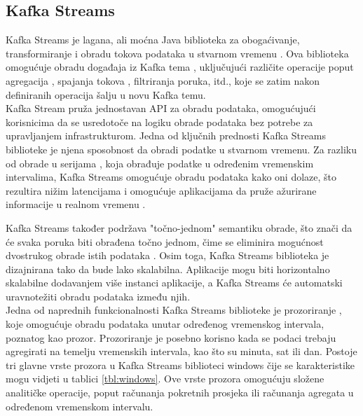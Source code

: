\documentclass[times, utf8, diplomski]{fer}
\begin{document}
\clearpage
\subsection{Kafka Streams}
\label{sec:kstream}

Kafka Streams je lagana, ali moćna Java biblioteka za obogaćivanje, transformiranje i obradu tokova podataka u stvarnom vremenu \citep{seymour_mastering_2021}. Ova biblioteka omogućuje obradu događaja  iz Kafka tema , uključujući različite operacije poput agregacija , spajanja tokova , filtriranja poruka, itd., koje se zatim nakon definiranih operacija šalju u novu Kafka temu. \\

Kafka Stream pruža jednostavan API za obradu podataka, omogućujući korisnicima da se usredotoče na logiku obrade podataka bez potrebe za upravljanjem infrastrukturom. Jedna od ključnih prednosti Kafka Streams biblioteke je njena sposobnost da obradi podatke u stvarnom vremenu. 
Za razliku od obrade u serijama , koja obrađuje podatke u određenim vremenskim intervalima, Kafka Streams omogućuje obradu podataka kako oni dolaze, što rezultira nižim latencijama i omogućuje aplikacijama da pruže ažurirane informacije u realnom vremenu \citep{seymour_mastering_2021}.

Kafka Streams također podržava "točno-jednom"  semantiku obrade, što znači da će svaka poruka biti obrađena točno jednom, čime se eliminira mogućnost dvostrukog obrade istih podataka \citep{narkhede_exactly-once_2017}.
Osim toga, Kafka Streams biblioteka je dizajnirana tako da bude lako skalabilna. Aplikacije mogu biti horizontalno skalabilne dodavanjem više instanci aplikacije, a Kafka Streams će automatski uravnotežiti obradu podataka između njih. \\

Jedna od naprednih funkcionalnosti Kafka Streams biblioteke je prozoriranje , koje omogućuje obradu podataka unutar određenog vremenskog intervala, poznatog kao prozor. Prozoriranje je posebno korisno kada se podaci trebaju agregirati na temelju vremenskih intervala, kao što su minuta, sat ili dan. Postoje tri glavne vrste prozora u Kafka Streams biblioteci windows čije se karakteristike mogu vidjeti u tablici \ref{tbl:windows}. Ove vrste prozora omogućuju složene analitičke operacije, poput računanja pokretnih prosjeka ili računanja agregata u određenom vremenskom intervalu.
\end{document}
